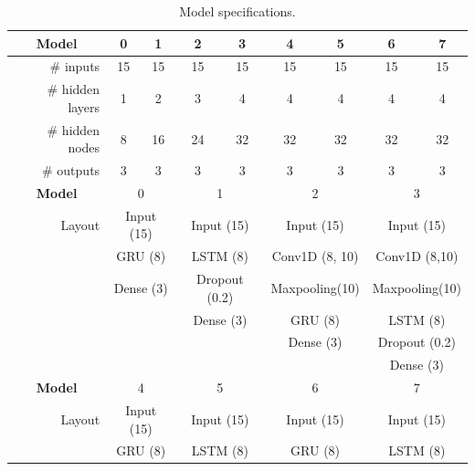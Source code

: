 \begin{table}[htbp]
  \centering
  \caption{Model specifications.}
    \begin{tabular}{r|cccccccc}
    \toprule
    \multicolumn{1}{c|}{\textbf{Model}} & 0     & 1     & 2     & 3     & 4     & 5     & 6     & 7 \\
    \midrule
    \# inputs & 15    & 15    & 15    & 15    & 15    & 15    & 15    & 15 \\
    \# hidden layers & 1     & 2     & 3     & 4     & 4     & 4     & 4     & 4 \\
    \# hidden nodes & 8     & 16    & 24    & 32    & 32    & 32    & 32    & 32 \\
    \# outputs & 3     & 3     & 3     & 3     & 3     & 3     & 3     & 3 \\
    \midrule
    \multicolumn{1}{c|}{\textbf{Model}} & \multicolumn{2}{c}{0} & \multicolumn{2}{c}{1} & \multicolumn{2}{c}{2} & \multicolumn{2}{c}{3} \\
    \midrule
    Layout & \multicolumn{2}{c}{Input (15)} & \multicolumn{2}{c}{Input (15)} & \multicolumn{2}{c}{Input (15)} & \multicolumn{2}{c}{Input (15)} \\
          & \multicolumn{2}{c}{GRU (8)} & \multicolumn{2}{c}{LSTM (8)} & \multicolumn{2}{c}{Conv1D (8, 10)} & \multicolumn{2}{c}{Conv1D (8,10)} \\
          & \multicolumn{2}{c}{Dense (3)} & \multicolumn{2}{c}{Dropout (0.2)} & \multicolumn{2}{c}{Maxpooling(10)} & \multicolumn{2}{c}{Maxpooling(10)} \\
          & \multicolumn{2}{c}{} & \multicolumn{2}{c}{Dense (3)} & \multicolumn{2}{c}{GRU (8)} & \multicolumn{2}{c}{LSTM (8)} \\
          & \multicolumn{2}{c}{} & \multicolumn{2}{c}{} & \multicolumn{2}{c}{Dense (3)} & \multicolumn{2}{c}{Dropout (0.2)} \\
          & \multicolumn{2}{c}{} & \multicolumn{2}{c}{} & \multicolumn{2}{c}{} & \multicolumn{2}{c}{Dense (3)} \\
    \midrule
    \multicolumn{1}{c|}{\textbf{Model}} & \multicolumn{2}{c}{4} & \multicolumn{2}{c}{5} & \multicolumn{2}{c}{6} & \multicolumn{2}{c}{7} \\
    \midrule
    Layout & \multicolumn{2}{c}{Input (15)} & \multicolumn{2}{c}{Input (15)} & \multicolumn{2}{c}{Input (15)} & \multicolumn{2}{c}{Input (15)} \\
          & \multicolumn{2}{c}{GRU (8)} & \multicolumn{2}{c}{LSTM (8)} & \multicolumn{2}{c}{GRU (8)} & \multicolumn{2}{c}{LSTM (8)} \\

\end{tabular}
\end{table}
